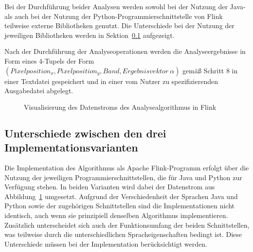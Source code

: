 Bei der Durchführung beider Analysen werden sowohl bei der Nutzung der Java- als auch bei der Nutzung der Python-Programmierschnittstelle von Flink teilweise externe Bibliotheken genutzt. Die Unterschiede bei der Nutzung der jeweiligen Bibliotheken werden in Sektion~\ref{sec:Differences} aufgezeigt. 

Nach der Durchführung der Analyseoperationen werden die Analyseergebnisse in Form eines 4-Tupels der Form $(Pixelposition_x, Pixelposition_y, Band, Ergebnisvektor\ \alpha)$ gemäß Schritt 8 in einer Textdatei gespeichert und in einer vom Nutzer zu spezifizierenden Ausgabedatei abgelegt.

\begin{figure}[h]
\centering

\caption{Visualisierung des Datenstroms des Analysealgorithmus in Flink} 
\label{fig:dataFlowAlgorithm}
\end{figure}


\subsection{Unterschiede zwischen den drei Implementationsvarianten}
\label{sec:Differences}
Die Implementation des Algorithmus als Apache Flink-Programm erfolgt über die Nutzung der jeweiligen Programmierschnittstellen, die für Java und Python zur Verfügung stehen. In beiden Varianten wird dabei der Datenstrom aus Abbildung~\ref{fig:dataFlowAlgorithm} umgesetzt. Aufgrund der Verschiedenheit der Sprachen Java und Python sowie der zugehörigen Schnittstellen sind die Implementationen nicht identisch, auch wenn sie prinzipiell denselben Algorithmus implementieren. Zusätzlich unterscheidet sich auch der Funktionsumfang der beiden Schnittstellen, was teilweise durch die unterschiedlichen Spracheigenschaften bedingt ist. Diese Unterschiede müssen bei der Implementation berücksichtigt werden. 

